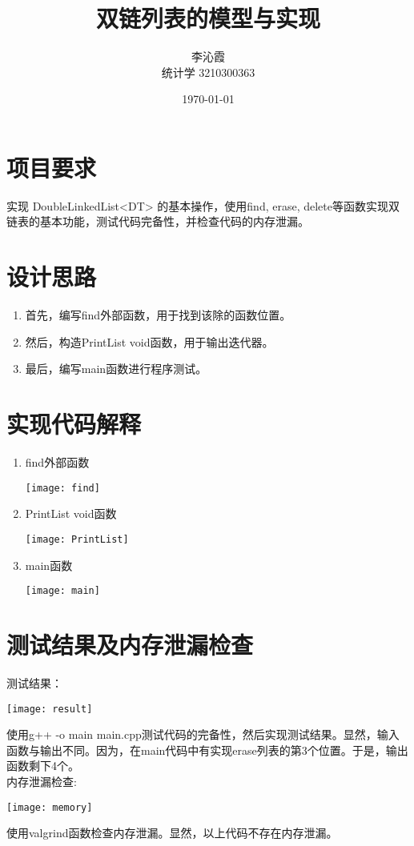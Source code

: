 \documentclass[a4paper]{article}
\title{双链列表的模型与实现}
\author{李沁霞 \\ 统计学 3210300363}
\date{\today}
\begin{document}
\maketitle

\section{项目要求}
实现 DoubleLinkedList<DT> 的基本操作，使用find, erase, delete等函数实现双链表的基本功能，测试代码完备性，并检查代码的内存泄漏。

\section{设计思路}
\begin{enumerate}
    \item 首先，编写find外部函数，用于找到该除的函数位置。
    \item 然后，构造PrintList void函数，用于输出迭代器。
    \item 最后，编写main函数进行程序测试。
\end{enumerate}

\section{实现代码解释}
\begin{enumerate}
    \item find外部函数
    \begin{center}
        \texttt{[image: find]}
    \end{center}
    \item PrintList void函数
    \begin{center}
        \texttt{[image: PrintList]}
    \end{center}
    \item main函数
    \begin{center}
        \texttt{[image: main]}
    \end{center}
\end{enumerate}

\section{测试结果及内存泄漏检查}
测试结果：
\begin{center}
    \texttt{[image: result]}
\end{center}
使用g++ -o main main.cpp测试代码的完备性，然后实现测试结果。显然，输入函数与输出不同。因为，在main代码中有实现erase列表的第3个位置。于是，输出函数剩下4个。\\

内存泄漏检查:
\begin{center}
    \texttt{[image: memory]}
\end{center}
使用valgrind函数检查内存泄漏。显然，以上代码不存在内存泄漏。
\end{document}
